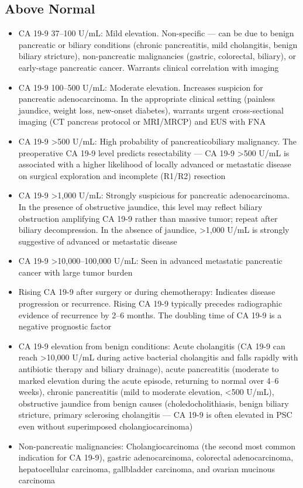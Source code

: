 \subsection*{Above Normal}
\begin{itemize}
  \item CA 19-9 37--100 U/mL: Mild elevation. Non-specific --- can be due to benign pancreatic or biliary conditions (chronic pancreatitis, mild cholangitis, benign biliary stricture), non-pancreatic malignancies (gastric, colorectal, biliary), or early-stage pancreatic cancer. Warrants clinical correlation with imaging
  \item CA 19-9 100--500 U/mL: Moderate elevation. Increases suspicion for pancreatic adenocarcinoma. In the appropriate clinical setting (painless jaundice, weight loss, new-onset diabetes), warrants urgent cross-sectional imaging (CT pancreas protocol or MRI/MRCP) and EUS with FNA
  \item CA 19-9 >500 U/mL: High probability of pancreaticobiliary malignancy. The preoperative CA 19-9 level predicts resectability --- CA 19-9 >500 U/mL is associated with a higher likelihood of locally advanced or metastatic disease on surgical exploration and incomplete (R1/R2) resection
  \item CA 19-9 >1,000 U/mL: Strongly suspicious for pancreatic adenocarcinoma. In the presence of obstructive jaundice, this level may reflect biliary obstruction amplifying CA 19-9 rather than massive tumor; repeat after biliary decompression. In the absence of jaundice, >1,000 U/mL is strongly suggestive of advanced or metastatic disease
  \item CA 19-9 >10,000--100,000 U/mL: Seen in advanced metastatic pancreatic cancer with large tumor burden
  \item Rising CA 19-9 after surgery or during chemotherapy: Indicates disease progression or recurrence. Rising CA 19-9 typically precedes radiographic evidence of recurrence by 2--6 months. The doubling time of CA 19-9 is a negative prognostic factor
  \item CA 19-9 elevation from benign conditions: Acute cholangitis (CA 19-9 can reach >10,000 U/mL during active bacterial cholangitis and falls rapidly with antibiotic therapy and biliary drainage), acute pancreatitis (moderate to marked elevation during the acute episode, returning to normal over 4--6 weeks), chronic pancreatitis (mild to moderate elevation, <500 U/mL), obstructive jaundice from benign causes (choledocholithiasis, benign biliary stricture, primary sclerosing cholangitis --- CA 19-9 is often elevated in PSC even without superimposed cholangiocarcinoma)
  \item Non-pancreatic malignancies: Cholangiocarcinoma (the second most common indication for CA 19-9), gastric adenocarcinoma, colorectal adenocarcinoma, hepatocellular carcinoma, gallbladder carcinoma, and ovarian mucinous carcinoma
\end{itemize}

